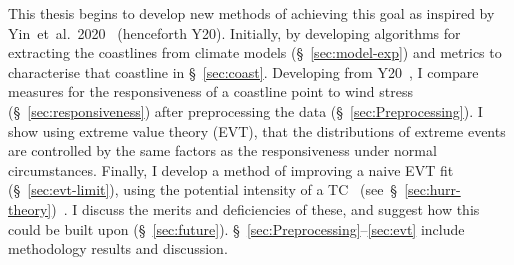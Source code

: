 This thesis begins to develop new methods of achieving this goal
as inspired by Yin~et~al.~2020~\cite{ZannaPreprint} (henceforth Y20).
Initially, by developing algorithms for extracting the coastlines from climate models (§~\ref{sec:model-exp})
and metrics to characterise that coastline in §~\ref{sec:coast}.
Developing from Y20~\cite{ZannaPreprint}, I compare measures for the
responsiveness of a coastline point to wind stress (§~\ref{sec:responsiveness})
after preprocessing the data (§~\ref{sec:Preprocessing}).
I show using extreme value theory (EVT), that the
distributions of extreme events are controlled by the same factors as
the responsiveness under normal circumstances.
Finally, I develop a
method of improving a naive EVT fit (§~\ref{sec:evt-limit}),
using the potential intensity of a TC~\cite{emanuel1999thermodynamic}
(see~§~\ref{sec:hurr-theory})~\cite{emanuel1987dependence,
 emanuel2016predictability}.
I discuss the merits and deficiencies of these,
and suggest how this could be built upon (§~\ref{sec:future}).
§~\ref{sec:Preprocessing}--\ref{sec:evt} include methodology
results and discussion.
